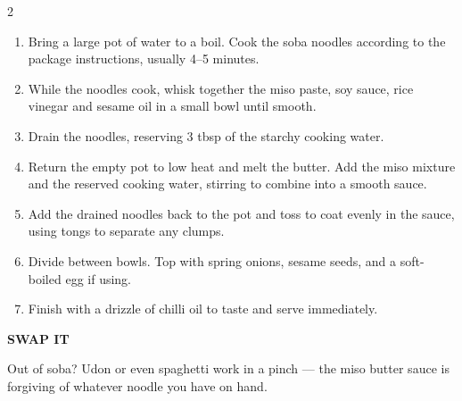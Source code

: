 \documentclass[a4paper,10pt]{article}
\begin{document}
\begin{multicols}{2}
\begin{enumerate}[leftmargin=1.3em, itemsep=5pt,
                   label={\color{tagline}\bfseries\arabic*}]
  \item Bring a large pot of water to a boil. Cook the soba noodles
    according to the package instructions, usually 4--5 minutes.
  \item While the noodles cook, whisk together the miso paste, soy sauce,
    rice vinegar and sesame oil in a small bowl until smooth.
  \item Drain the noodles, reserving 3 tbsp of the starchy cooking water.
  \item Return the empty pot to low heat and melt the butter. Add the miso
    mixture and the reserved cooking water, stirring to combine into a
    smooth sauce.
  \item Add the drained noodles back to the pot and toss to coat evenly in
    the sauce, using tongs to separate any clumps.
  \item Divide between bowls. Top with spring onions, sesame seeds, and a
    soft-boiled egg if using.
  \item Finish with a drizzle of chilli oil to taste and serve
    immediately.
\end{enumerate}

\vspace{0.8em}
{\color{tagline}\bfseries\small SWAP IT}
\vspace{0.3em}

Out of soba? Udon or even spaghetti work in a pinch --- the miso butter
sauce is forgiving of whatever noodle you have on hand.

\end{multicols}
\end{document}
